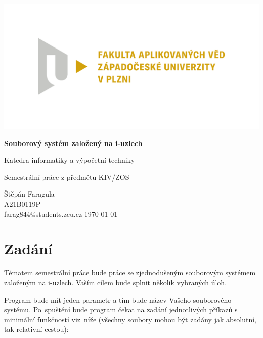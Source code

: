 \documentclass[12pt]{report}
\begin{document}
	
	\begin{titlepage}
		\centering
		\Large
		
		\includegraphics[width=.7\textwidth]{fav}
		
		\vspace{15mm}
		{\Huge\bfseries Souborový systém založený na i-uzlech}
		
		\vspace{5mm}
		{\LARGE Katedra informatiky a výpočetní techniky}
		
		{\LARGE Semestrální práce z předmětu KIV/ZOS}
		
		\vfill
		\raggedright
		Štěpán Faragula\\
		A21B0119P\\
		farag844@students.zcu.cz
		\hfill 
		\today
	\end{titlepage}
	
	
	\tableofcontents


	\chapter{Zadání}
	Tématem semestrální práce bude práce se zjednodušeným souborovým systémem založeným na i-uzlech. Vaším cílem bude splnit několik vybraných úloh.
		
	Program bude mít jeden parametr a tím bude název Vašeho souborového systému. Po~spuštění bude program čekat na zadání jednotlivých příkazů s minimální funkčností viz~níže (všechny soubory mohou být zadány jak absolutní, tak relativní cestou):
	
\end{document}
